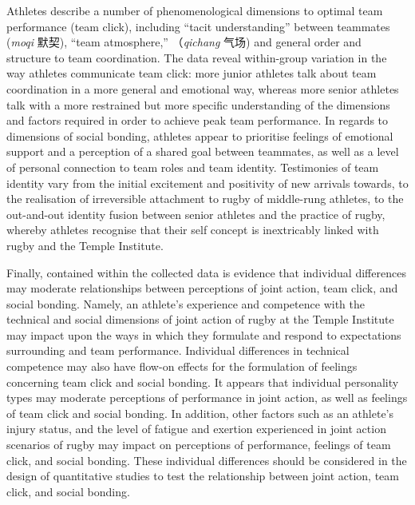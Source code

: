 \begin{CJK}{UTF8}{gbsn}
Athletes describe a number of phenomenological dimensions to optimal team performance (team click), including ``tacit understanding'' between teammates (\textit{moqi} 默契), ``team atmosphere,'' （\textit{qichang} 气场) and general order and structure to team coordination.  The data reveal within-group variation in the way athletes communicate team click: more junior athletes talk about team coordination in a more general and emotional way, whereas more senior athletes talk with a more restrained but more specific understanding of the dimensions and factors required in order to achieve peak team performance.  In regards to dimensions of social bonding, athletes appear to prioritise feelings of emotional support and a perception of a shared goal between teammates, as well as a level of personal connection to team roles and team identity.  Testimonies of team identity vary from the initial excitement and positivity of new arrivals towards, to the realisation of irreversible attachment to rugby of middle-rung athletes, to the out-and-out identity fusion between senior athletes and the practice of rugby, whereby athletes recognise that their self concept is inextricably linked with rugby and the Temple Institute.

Finally, contained within the collected data is evidence that individual differences may moderate relationships between perceptions of joint action, team click, and social bonding.  Namely, an athlete's experience and competence with the technical and social dimensions of joint action of rugby at the Temple Institute may impact upon the ways in which they formulate and respond to expectations surrounding and team performance.  Individual differences in technical competence may also have flow-on effects for the formulation of feelings concerning team click and social bonding. It appears that individual personality types may moderate perceptions of performance in joint action, as well as feelings of team click and social bonding. In addition, other factors such as an athlete's injury status, and the level of fatigue and exertion experienced in joint action scenarios of rugby may impact on perceptions of performance, feelings of team click, and social bonding.  These individual differences should be considered in the design of quantitative studies to test the relationship between joint action, team click, and social bonding.















                                                          \end{CJK}
